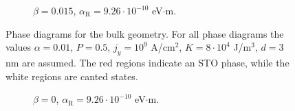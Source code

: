 \begin{figure}[h!]
\begin{subfigure}{.49\textwidth}
  \caption{$\beta = 0.015$, $\alpha_\text{R} = 9.26\cdot10^{-10}$ eV$\cdot$m.}
\end{subfigure}
\caption{Phase diagrams for the bulk geometry. For all phase diagrams the values $\alpha=0.01$, $P=0.5$, $j_y=10^9$ A/cm$^2$, $K=8\cdot10^4$ J/m$^3$, $d=3$ nm are assumed. The red regions indicate an STO phase, while the white regions are canted states. }
\label{fig:STOBulkPhase}
\end{figure}

\begin{figure}[h!]
\centering
\begin{subfigure}{.49\textwidth}
  \centering
  \caption{$\beta = 0$, $\alpha_\text{R} = 9.26\cdot10^{-10}$ eV$\cdot$m.}
  \label{fig:STOFilmXi0R25}
\end{subfigure}%
\begin{subfigure}{.49\textwidth}
  \centering
    \begin{tikzpicture}

\end{tikzpicture}
\end{subfigure}
\end{figure}
